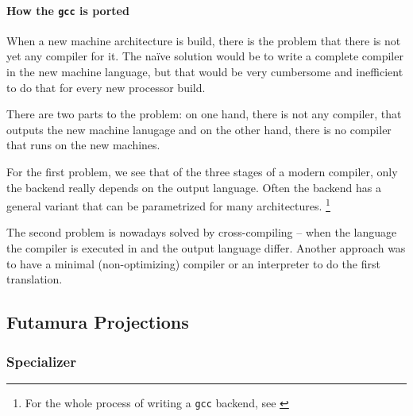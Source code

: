 \paragraph{How the {\tt gcc} is ported} %
\label{par:gcc}
When a new machine architecture is build, there is the problem that there is 
not yet any compiler for it. The naïve solution would be to write a complete 
compiler in the new machine language, but that would be very cumbersome and 
inefficient to do that for every new processor build.

There are two parts to the problem: on one hand, there is not any compiler, 
that outputs the new machine lanugage and on the other hand, there is no 
compiler that runs on the new machines.

For the first problem, we see that of the three stages of a modern compiler,
only the backend really depends on the output language. Often the backend has 
a general variant that can be parametrized for many architectures.
\footnote{For the whole process of writing a {\tt gcc} backend, see \cite{nilsson2000porting}}

The second problem is nowadays solved by cross-compiling -- when the language 
the compiler is executed in and the output language differ. Another approach 
was to have a minimal (non-optimizing) compiler or an interpreter to do the 
first translation.
\subsection{Futamura Projections} %
\label{sub:Futamura}
\subsubsection{Specializer} %
\label{ssub:Specializer}
